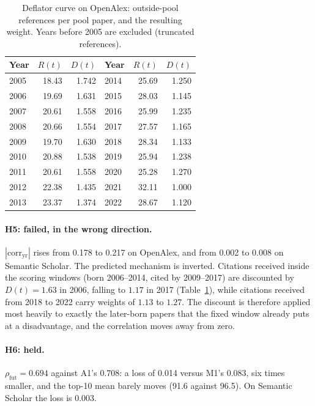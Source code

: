\documentclass{article}
\begin{document}
\begin{table}[h]
\caption{Deflator curve on OpenAlex: outside-pool references per pool paper, and the resulting
  weight. Years before 2005 are excluded (truncated references).}
\label{tab:rt}
\centering
\footnotesize
\setlength{\tabcolsep}{4pt}
\begin{tabular}{lrr|lrr}
\toprule
\textbf{Year} & $R(t)$ & $D(t)$ & \textbf{Year} & $R(t)$ & $D(t)$ \\
\midrule
2005 & 18.43 & 1.742 & 2014 & 25.69 & 1.250 \\
2006 & 19.69 & 1.631 & 2015 & 28.03 & 1.145 \\
2007 & 20.61 & 1.558 & 2016 & 25.99 & 1.235 \\
2008 & 20.66 & 1.554 & 2017 & 27.57 & 1.165 \\
2009 & 19.70 & 1.630 & 2018 & 28.34 & 1.133 \\
2010 & 20.88 & 1.538 & 2019 & 25.94 & 1.238 \\
2011 & 20.61 & 1.558 & 2020 & 25.28 & 1.270 \\
2012 & 22.38 & 1.435 & 2021 & 32.11 & 1.000 \\
2013 & 23.37 & 1.374 & 2022 & 28.67 & 1.120 \\
\bottomrule
\end{tabular}
\end{table}

\paragraph{H5: failed, in the wrong direction.} $|\text{corr}_{\text{yr}}|$ rises from 0.178 to
0.217 on OpenAlex, and from 0.002 to 0.008 on Semantic Scholar. The predicted mechanism is
inverted. Citations received inside the scoring windows (born 2006--2014, cited by 2009--2017) are
discounted by $D(t) = 1.63$ in 2006, falling to $1.17$ in 2017 (Table~\ref{tab:rt}), while
citations received from 2018 to 2022 carry weights of $1.13$ to $1.27$. The discount is therefore
applied most heavily to exactly the later-born papers that the fixed window already puts at a
disadvantage, and the correlation moves away from zero.

\paragraph{H6: held.} $\rho_{\text{fut}} = 0.694$ against A1's 0.708: a loss of 0.014 versus
M1's 0.083, six times smaller, and the top-10 mean barely moves (91.6 against 96.5). On Semantic
Scholar the loss is 0.003.
\end{document}
